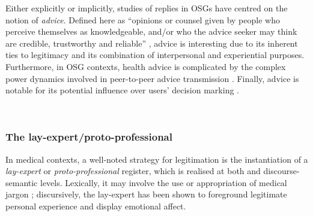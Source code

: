 			Either explicitly or implicitly, studies of replies in OSGs have centred on the notion of \emph{advice}. Defined here as ``opinions or counsel given by people who perceive themselves as knowledgeable, and/or who the advice seeker may think are credible, trustworthy and reliable'' \cite[p.~519]{decapua_strategies_1993}, advice is interesting due to its inherent ties to legitimacy and its combination of interpersonal and experiential purposes. Furthermore, in OSG contexts, health advice is complicated by the complex power dynamics involved in peer-to-peer advice transmission \cite{kouper_pragmatics_2010}. Finally, advice is notable for its potential influence over users' decision marking \cite{sillence_giving_2013}.

			~\\

		 \subsubsection{The lay-expert/proto-professional}

			In medical contexts, a well-noted strategy for legitimation is the instantiation of a \emph{lay-expert} or \emph{proto-professional} register, which is realised at both  and discourse-semantic levels. Lexically, it may involve the use or appropriation of medical jargon \cite{harvey_disclosures_2012,sullivan_gendered_2003}; discursively, the lay-expert has been shown to foreground legitimate personal experience and display emotional affect. %

